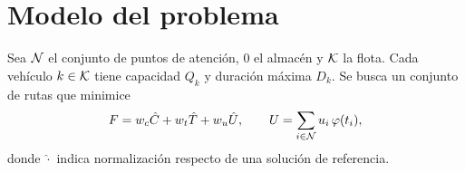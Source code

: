 \chapter{Modelo del problema}\label{cap:modelo}

Sea $\mathcal{N}$ el conjunto de puntos de atención, $0$ el almacén y $\mathcal{K}$ la flota. Cada
vehículo $k \in \mathcal{K}$ tiene capacidad $Q_k$ y duración máxima $D_k$. Se busca un conjunto de
rutas que minimice
\begin{equation}
  F = w_c \hat{C} + w_t \hat{T} + w_u \hat{U},
  \qquad
  U = \sum_{i \in \mathcal{N}} u_{i}\, \varphi(t_{i}),
  \label{eq:objetivo}
\end{equation}
donde $\hat{\cdot}$ indica normalización respecto de una solución de referencia.

